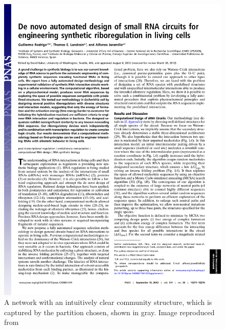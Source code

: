 \documentclass[10pt,journal]{./IEEE_latex_class/IEEEtran}
\begin{document}
\begin{figure}[H]
\centering
\includegraphics[trim = 60 630 300 30,page=2,clip = true]{pnas1203831109.pdf}
\caption{A network with an intuitively clear community structure, which is captured by the partition chosen, shown in gray. Image reproduced from \cite{Rodrigo2012}}
\label{reactionscheme}
\end{figure}
\end{document}
